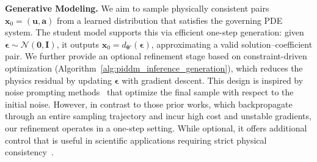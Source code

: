 \documentclass{article}
\theoremstyle{plain}
\theoremstyle{definition}
\theoremstyle{remark}
\def\va{{\bm{a}}}
\def\vu{{\bm{u}}}
\def\vx{{\bm{x}}}
\begin{document}
\noindent\textbf{Generative Modeling.}
We aim to sample physically consistent pairs $\vx_0=(\vu,\va)$ from a learned distribution that satisfies the governing PDE system. The student model supports this via efficient one-step generation: given $\boldsymbol{\epsilon}\sim\mathcal{N}(\mathbf{0},\bm{I})$, it outputs $\vx_0=d_{\boldsymbol{\theta}'}(\boldsymbol{\epsilon})$, approximating a valid solution–coefficient pair. We further provide an optional refinement stage based on constraint-driven optimization (Algorithm~\ref{alg:piddm_inference_generation}), which reduces the physics residual by updating $\boldsymbol{\epsilon}$ with gradient descent. This design is inspired by noise prompting methods~\cite{ben2024dflow, guo2024initno_goldennoise} that optimize the final sample with respect to the initial noise. However, in contrast to those prior works, which backpropagate through an entire sampling trajectory and incur high cost and unstable gradients, our refinement operates in a one-step setting. While optional, it offers additional control that is useful in scientific applications requiring strict physical consistency~\cite{leveque1992numerical, hansen2023learning, mouli2024using, saad2022guiding}.
\end{document}
